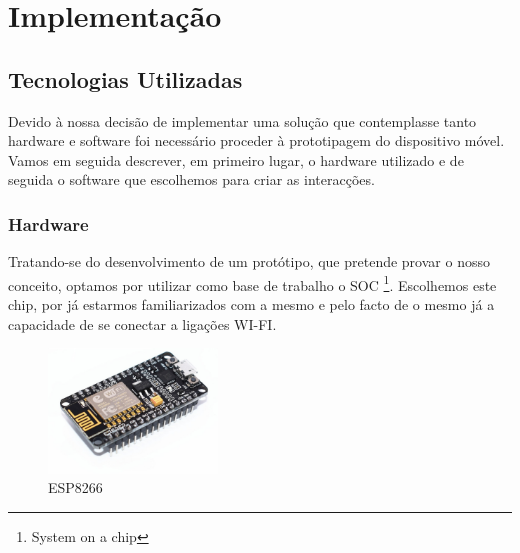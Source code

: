 \chapter{Implementação}
\label{cap4}


\section{Tecnologias Utilizadas}

Devido à nossa decisão de implementar uma solução que contemplasse tanto hardware e software foi necessário proceder à prototipagem do dispositivo móvel. Vamos em seguida descrever, em primeiro lugar, o hardware utilizado e de seguida o software que escolhemos para criar as interacções.

\FloatBarrier\subsection{Hardware}

Tratando-se do desenvolvimento de um protótipo, que pretende provar o nosso conceito, optamos por utilizar como base de trabalho o SOC \footnote{System on a chip}\cite{ESP8266EX}. Escolhemos este chip, por já estarmos familiarizados com a mesmo e pelo facto de o mesmo já a capacidade de se conectar a ligações WI-FI.

\begin{figure}[!htb]
	\centering
	\includegraphics[width=0.4\textwidth]{figuras/ESP8266.jpg}
	\caption{ESP8266}
	\label{fig:ESP8266}
\end{figure}

